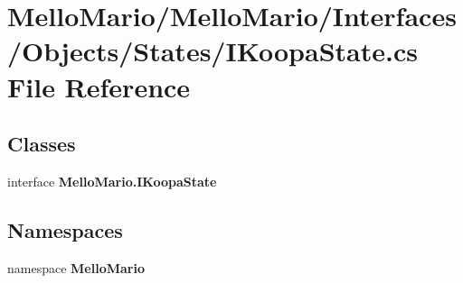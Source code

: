 \section{Mello\+Mario/\+Mello\+Mario/\+Interfaces/\+Objects/\+States/\+I\+Koopa\+State.cs File Reference}
\label{IKoopaState_8cs}
\subsection*{Classes}
\begin{DoxyCompactItemize}
\item 
interface \textbf{ Mello\+Mario.\+I\+Koopa\+State}
\end{DoxyCompactItemize}
\subsection*{Namespaces}
\begin{DoxyCompactItemize}
\item 
namespace \textbf{ Mello\+Mario}
\end{DoxyCompactItemize}
